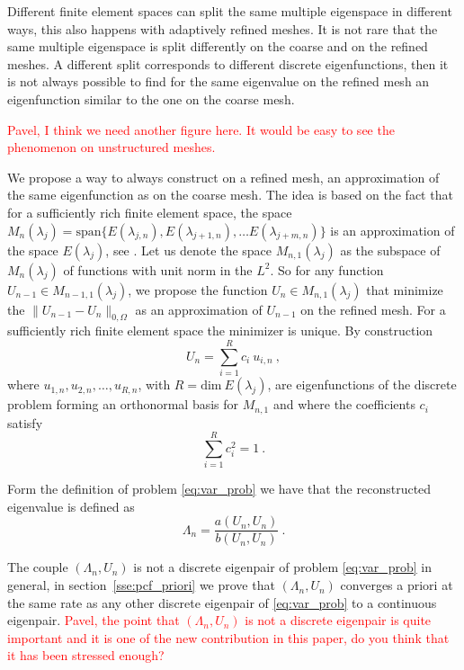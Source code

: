\documentclass[preprint ,12pt]{elsarticle}
\begin{document}
Different finite element spaces can split the same multiple eigenspace in different ways, this also happens with adaptively refined meshes. It is not rare that the same multiple eigenspace is split differently on the coarse and on the refined meshes. A different split corresponds to different discrete eigenfunctions, then it is not always possible to find for the same eigenvalue on the refined mesh an eigenfunction similar to the one on the coarse mesh.

\textcolor{red}{Pavel, I think we need another figure here. It would be easy to see the phenomenon on unstructured meshes.}

We propose a way to always construct on a refined mesh, an approximation of the same eigenfunction as on the coarse mesh. The idea is based on the fact that for a sufficiently rich finite element space, the space $M_n(\lambda_j)=\mathrm{span}\{E(\lambda_{j,n}),E(\lambda_{j+1,n}),\dots E(\lambda_{j+m,n})\}$ is an approximation of the space $E(\lambda_j)$, see \cite{strang}. Let us denote the space $M_{n,1}(\lambda_j)$ as the subspace of $M_n(\lambda_j)$ of functions with unit norm in the $L^2$.
So for any function $U_{n-1}\in M_{n-1,1}(\lambda_j)$, we propose the function $U_{n}\in M_{n,1}(\lambda_j)$ that minimize the $\|U_{n-1}-U_{n}\|_{0,\Omega}$ as an approximation of $U_{n-1}$ on the refined mesh. For a sufficiently rich finite element space the minimizer is unique. By construction
\begin{equation}\label{eq:const}
U_n=\sum_{i=1}^{R} c_i \ u_{i,n}\ ,
\end{equation}
where $u_{1,n},u_{2,n},\dots,u_{R,n}$, with $R=\mathrm{dim}\ E(\lambda_j)$, are eigenfunctions of the discrete problem forming  an orthonormal basis for
$M_{n,1}$ and where the coefficients $c_i$ satisfy 
\begin{equation}\label{eq:cond_on_corf}
\sum_{i=1}^{R} c_i^2=1\ .
\end{equation}

Form the definition of problem \eqref{eq:var_prob} we have that the reconstructed eigenvalue is defined as
$$
\Lambda_n=\frac{a(U_n,U_n)}{b(U_n,U_n)}\ .
$$

The couple $(\Lambda_n,U_n)$ is not a discrete eigenpair of problem \eqref{eq:var_prob} in general, in section~\ref{sse:pcf_priori} we prove that $(\Lambda_n,U_n)$ converges a priori at the same rate as any other discrete eigenpair of \eqref{eq:var_prob} to a continuous eigenpair.
\textcolor{red}{Pavel, the point that $(\Lambda_n,U_n)$ is not a discrete eigenpair is quite important and it is one of the new contribution in this paper, do you think that it has been stressed enough?}
\end{document}
